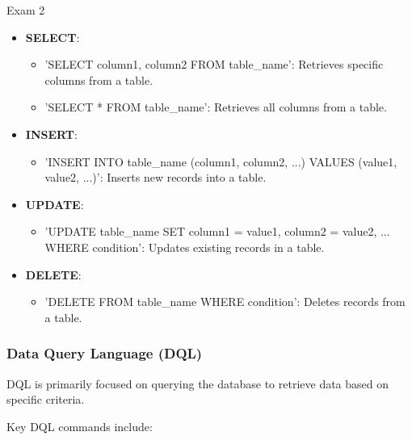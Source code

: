 \begin{examnotes}{Exam 2}
\begin{highlight}
        \begin{itemize}
            \item \textbf{SELECT}:
                \begin{itemize}
                    \item 'SELECT column1, column2 FROM table\_name': Retrieves specific columns from a table.
                    \item 'SELECT * FROM table\_name': Retrieves all columns from a table.
                \end{itemize}
            \item \textbf{INSERT}:
                \begin{itemize}
                    \item 'INSERT INTO table\_name (column1, column2, ...) VALUES (value1, value2, ...)': Inserts new records into a table.
                \end{itemize}
            \item \textbf{UPDATE}:
                \begin{itemize}
                    \item 'UPDATE table\_name SET column1 = value1, column2 = value2, ... WHERE condition': Updates existing records in a table.
                \end{itemize}
            \item \textbf{DELETE}:
                \begin{itemize}
                    \item 'DELETE FROM table\_name WHERE condition': Deletes records from a table.
                \end{itemize}
        \end{itemize}
    \end{highlight}
    
    \subsubsection*{Data Query Language (DQL)}
    
    DQL is primarily focused on querying the database to retrieve data based on specific criteria.
    
    \begin{highlight}
        Key DQL commands include:
        

\end{highlight}
\end{examnotes}
